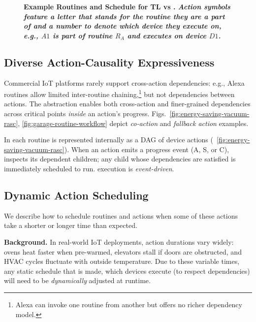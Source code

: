 \begin{figure}[t]
    \vspace{-0.35cm}
    
    \caption{\bf \small Example Routines and Schedule for TL vs \scheduler. {\it Action symbols feature a letter that stands for the routine they are a part of and a number to denote which device they execute on, e.g., $A1$ is part of routine $R_A$ and executes on device $D1$.}}
    \label{fig:TL-vs-DAG-TL}
    \vspace{-0.45cm} 
\end{figure}

\subsection{Diverse Action-Causality Expressiveness}
\label{sec:causality}

Commercial IoT platforms rarely support cross-action dependencies: e.g., Alexa routines allow limited inter-routine chaining,\footnote{Alexa can invoke one routine from another but offers no richer dependency model.} but not dependencies between actions. The \abs{} abstraction enables both cross-action and finer-grained dependencies across critical points {\it inside} an action's progress.
Figs.~\ref{fig:energy-saving-vacuum-rasc}, \ref{fig:garage-routine-workflow} depict {\it co-action} and \textit{fallback action} examples.

In \sysname{} each routine is represented internally as a DAG of device actions (\Figure~\ref{fig:energy-saving-vacuum-rasc}). When an action emits a progress event (A, S, or C), \sysname{} inspects its dependent children; any child whose dependencies are satisfied is immediately scheduled to run. \sysname{} execution is {\it event-driven}.


\subsection{Dynamic Action Scheduling}
\label{sec:dyn-sched}
We describe how to schedule routines and actions when some of these actions take a shorter or longer time than expected. 

\noindent\textbf{Background.}
In real-world IoT deployments, action durations vary widely:
ovens heat faster when pre-warmed, elevators stall if doors are obstructed,
and HVAC cycles fluctuate with outside temperature. 
Due to these variable times, any static schedule that is made, which devices execute (to respect dependencies) will need to be {\it dynamically} adjusted at runtime.


